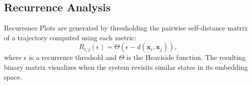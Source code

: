 \documentclass[a4paper,12pt]{article}
\begin{document}

    \subsection{Recurrence Analysis}
    \label{subsec:recurrence_analysis_methods}

    Recurrence Plots are generated by thresholding the pairwise self-distance matrix of a trajectory computed using each metric:
    \begin{equation}
        R_{i,j}(\epsilon) = \Theta(\epsilon - d(\mathbf{x}_i, \mathbf{x}_j)),
    \end{equation}
    where $\epsilon$ is a recurrence threshold and $\Theta$ is the Heaviside function. The resulting binary matrix visualizes when the system revisits similar states in its embedding space.
\end{document}
